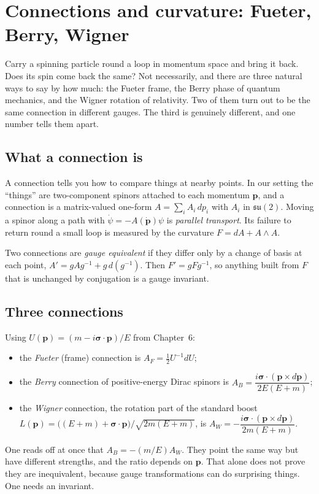 \chapter{Connections and curvature: Fueter, Berry, Wigner}\label{ch:connections}

\begin{questionbox}
Carry a spinning particle round a loop in momentum space and bring it back. Does its spin come back the same? Not necessarily, and there are three natural ways to say by how much: the Fueter frame, the Berry phase of quantum mechanics, and the Wigner rotation of relativity. Two of them turn out to be the same connection in different gauges. The third is genuinely different, and one number tells them apart.
\end{questionbox}

\section{What a connection is}

A connection tells you how to compare things at nearby points. In our setting the ``things'' are two-component spinors attached to each momentum $\mathbf p$, and a connection is a matrix-valued one-form $A=\sum_iA_i\,dp_i$ with $A_i$ in $\mathfrak{su}(2)$. Moving a spinor along a path with $\dot\psi=-A(\dot{\mathbf p})\psi$ is \emph{parallel transport}. Its failure to return round a small loop is measured by the curvature $F=dA+A\wedge A$.

Two connections are \emph{gauge equivalent} if they differ only by a change of basis at each point, $A'=gAg^{-1}+g\,d(g^{-1})$. Then $F'=gFg^{-1}$, so anything built from $F$ that is unchanged by conjugation is a gauge invariant.

\section{Three connections}

Using $U(\mathbf p)=(m-i\boldsymbol\sigma\cdot\mathbf p)/E$ from Chapter~6:
\begin{itemize}[leftmargin=*]
\item the \emph{Fueter} (frame) connection is $A_F=\tfrac12U^{-1}dU$;
\item the \emph{Berry} connection of positive-energy Dirac spinors is $A_B=\dfrac{i\boldsymbol\sigma\cdot(\mathbf p\times d\mathbf p)}{2E(E+m)}$;
\item the \emph{Wigner} connection, the rotation part of the standard boost $L(\mathbf p)=\bigl((E+m)+\boldsymbol\sigma\cdot\mathbf p\bigr)/\sqrt{2m(E+m)}$, is $A_W=-\dfrac{i\boldsymbol\sigma\cdot(\mathbf p\times d\mathbf p)}{2m(E+m)}$.
\end{itemize}
One reads off at once that $A_B=-(m/E)A_W$. They point the same way but have different strengths, and the ratio depends on $\mathbf p$. That alone does not prove they are inequivalent, because gauge transformations can do surprising things. One needs an invariant.


